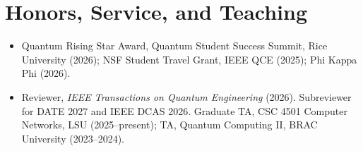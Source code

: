 \documentclass[letterpaper,10pt]{article}
\begin{document}
\section{Honors, Service, and Teaching}
\begin{itemize}
  \item Quantum Rising Star Award, Quantum Student Success Summit, Rice University (2026); NSF Student Travel Grant, IEEE QCE (2025); Phi Kappa Phi (2026).
  \item Reviewer, \textit{IEEE Transactions on Quantum Engineering} (2026). Subreviewer for DATE 2027 and IEEE DCAS 2026. Graduate TA, CSC 4501 Computer Networks, LSU (2025--present); TA, Quantum Computing II, BRAC University (2023--2024).
\end{itemize}
\end{document}
